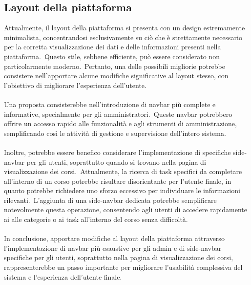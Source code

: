 \subsection{Layout della piattaforma}\label{sec:cap_sec_subsec}
Attualmente, il layout della piattaforma si presenta con un design estremamente minimalista, 
concentrandosi esclusivamente su ciò che è strettamente necessario per la corretta visualizzazione 
dei dati e delle informazioni presenti nella piattaforma.\ Questo stile, sebbene efficiente, 
può essere considerato non particolarmente moderno.\ Pertanto, una delle possibili migliorie potrebbe 
consistere nell'apportare alcune modifiche significative al layout stesso, con l'obiettivo di migliorare l'esperienza dell'utente.
\\ \\
Una proposta consisterebbe nell'introduzione di navbar più complete e informative, specialmente per gli amministratori.\ 
Queste navbar potrebbero offrire un accesso rapido alle funzionalità e agli strumenti di amministrazione, 
semplificando così le attività di gestione e supervisione dell'intero sistema.
\\ \\
Inoltre, potrebbe essere benefico considerare l'implementazione di specifiche side-navbar per gli utenti, 
soprattutto quando si trovano nella pagina di visualizzazione dei corsi.\ 
Attualmente, la ricerca di task specifici da completare all'interno di un corso potrebbe risultare disorientante per l'utente finale, 
in quanto potrebbe richiedere uno sforzo eccessivo per individuare le informazioni rilevanti.\ 
L'aggiunta di una side-navbar dedicata potrebbe semplificare notevolmente questa operazione, 
consentendo agli utenti di accedere rapidamente ai alle categorie o ai task all'interno del corso senza difficoltà.
\\ \\
In conclusione, apportare modifiche al layout della piattaforma attraverso l'implementazione di navbar 
più esaustive per gli admin e di side-navbar specifiche per gli utenti, soprattutto nella pagina di visualizzazione dei corsi, 
rappresenterebbe un passo importante per migliorare l'usabilità complessiva del sistema e l'esperienza dell'utente finale.
%